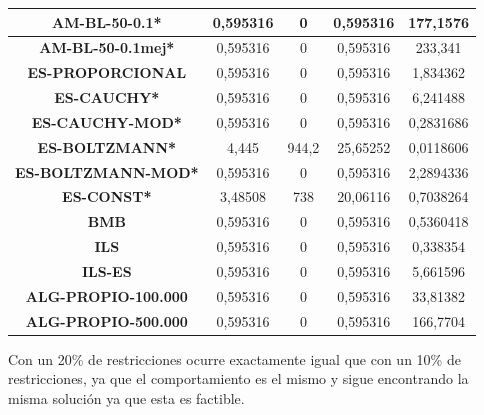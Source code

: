 \documentclass[12pt, spanish]{article}
\begin{document}
\begin{table}[H]
\begin{tabular}{|c|c|c|c|c|}
\textbf{AM-BL-50-0.1*}      & 0,595316                  & 0                           & 0,595316               & 177,1576   \\ \hline
\textbf{AM-BL-50-0.1mej*}   & 0,595316                  & 0                           & 0,595316               & 233,341    \\ \hline
\textbf{ES-PROPORCIONAL}    & 0,595316                  & 0                           & 0,595316               & 1,834362   \\ \hline
\textbf{ES-CAUCHY*}         & 0,595316                  & 0                           & 0,595316               & 6,241488   \\ \hline
\textbf{ES-CAUCHY-MOD*}     & 0,595316                  & 0                           & 0,595316               & 0,2831686  \\ \hline
\textbf{ES-BOLTZMANN*}      & 4,445                     & 944,2                       & 25,65252               & 0,0118606  \\ \hline
\textbf{ES-BOLTZMANN-MOD*}  & 0,595316                  & 0                           & 0,595316               & 2,2894336  \\ \hline
\textbf{ES-CONST*}          & 3,48508                   & 738                         & 20,06116               & 0,7038264  \\ \hline
\textbf{BMB}                & 0,595316                  & 0                           & 0,595316               & 0,5360418  \\ \hline
\textbf{ILS}                & 0,595316                  & 0                           & 0,595316               & 0,338354   \\ \hline
\textbf{ILS-ES}             & 0,595316                  & 0                           & 0,595316               & 5,661596   \\ \hline
\textbf{ALG-PROPIO-100.000} & 0,595316                  & 0                           & 0,595316               & 33,81382   \\ \hline
\textbf{ALG-PROPIO-500.000} & 0,595316                  & 0                           & 0,595316               & 166,7704   \\ \hline
\end{tabular}
\end{table}

Con un 20\% de restricciones ocurre exactamente igual que con un 10\% de restricciones, ya que el comportamiento es el mismo y sigue encontrando la misma solución ya que esta es factible.
\end{document}
